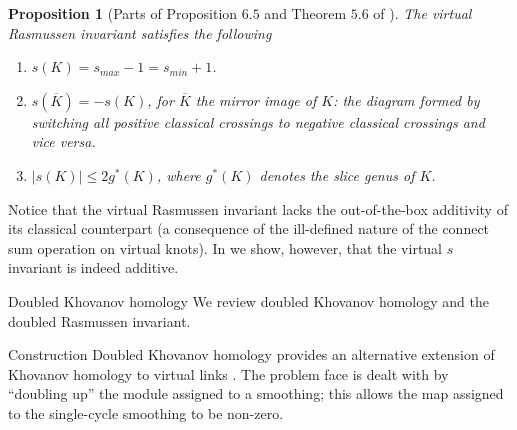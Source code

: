 \documentclass[10pt,oneside]{amsart}
\newtheorem{proposition}[theorem]{Proposition}
\theoremstyle{definition}
\numberwithin{equation}{section}
\begin{document}
\begin{proposition}[Parts of Proposition \( 6.5 \) and Theorem \( 5.6 \) of \cite{Dye2014}]
	\label{Prop:Rasproperties}
		The virtual Rasmussen invariant satisfies the following
		\begin{enumerate}
			\item \( s ( K ) = s_{max} - 1 = s_{min} + 1 \).
			\item \( s ( \overline{K} ) = - s ( K ) \), for \( \overline{K} \) the mirror image of \( K \): the diagram formed by switching all positive classical crossings to negative classical crossings and vice versa.
			\item \( | s ( K ) | \leq 2 g^\ast ( K ) \), where \( g^\ast ( K ) \) denotes the slice genus of \( K \).
		\end{enumerate}
	
\end{proposition}
Notice that the virtual Rasmussen invariant lacks the out-of-the-box additivity of its classical counterpart (a consequence of the ill-defined nature of the connect sum operation on virtual knots). In  we show, however, that the virtual \( s \) invariant is indeed additive.

{		{\normalfont\bfseries\large}}{Doubled Khovanov homology}\label{Sec:doubledreview}
We review doubled Khovanov homology and the doubled Rasmussen invariant.

{		{\normalfont\bfseries}}{Construction}
Doubled Khovanov homology provides an alternative extension of Khovanov homology to virtual links \cite{Rushworth2017}. The problem face is dealt with by ``doubling up'' the module assigned to a smoothing; this allows the map assigned to the single-cycle smoothing to be non-zero.
\end{document}
